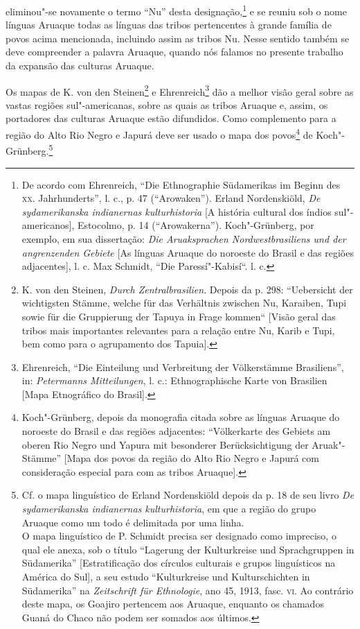eliminou"-se novamente o termo ``Nu'' desta designação,\footnote{De acordo
  com Ehrenreich, ``Die Ethnographie Südamerikas im Beginn des \textsc{xx}.
  Jahrhunderts'', l. c., p. 47 (``Arowaken''). Erland Nordenskiöld,
  \emph{De sydamerikanska indianernas kulturhistoria} {[}A história
  cultural dos índios sul"-americanos{]}, Estocolmo, p. 14
  (``Arowakerna''). Koch"-Grünberg, por exemplo, em sua dissertação:
  \emph{Die Aruaksprachen Nordwestbrasiliens und der angrenzenden
  Gebiete} {[}As línguas Aruaque do noroeste do Brasil e das regiões
  adjacentes{]}, l. c. Max Schmidt, ``Die Paressí"-Kabisí``. l. c.} e se
reuniu sob o nome línguas Aruaque todas as línguas das tribos
pertencentes à grande família de povos acima mencionada, incluindo assim
as tribos Nu. Nesse sentido também se deve compreender a palavra
Aruaque, quando nós falamos no presente trabalho da expansão das
culturas Aruaque.

Os mapas de K. von den Steinen\footnote{K. von den Steinen, \emph{Durch
  Zentralbrasilien}. Depois da p. 298: ``Uebersicht der wichtigsten
  Stämme, welche für das Verhältnis zwischen Nu, Karaiben, Tupi sowie
  für die Gruppierung der Tapuya in Frage kommen`` {[}Visão geral das
  tribos mais importantes relevantes para a relação entre Nu, Karib e
  Tupi, bem como para o agrupamento dos Tapuia{]}.} e
Ehrenreich\footnote{Ehrenreich, ``Die Einteilung und Verbreitung der
  Völkerstämme Brasiliens'', in: \emph{Petermanns Mitteilungen}, l. c.:
  Ethnographische Karte von Brasilien {[}Mapa Etnográfico do Brasil{]}.}
dão a melhor visão geral sobre as vastas regiões sul"-americanas, sobre
as quais as tribos Aruaque e, assim, os portadores das culturas Aruaque
estão difundidos. Como complemento para a região do Alto Rio Negro e
Japurá deve ser usado o mapa dos povos\footnote{Koch"-Grünberg, depois da
  monografia citada sobre as línguas Aruaque do noroeste do Brasil e das
  regiões adjacentes: ``Völkerkarte des Gebiets am oberen Rio Negro und
  Yapura mit besonderer Berücksichtigung der Aruak"-Stämme'' {[}Mapa dos
  povos da região do Alto Rio Negro e Japurá com consideração especial
  para com as tribos Aruaque{]}.} de Koch"-Grünberg.\footnote{Cf. o mapa
  linguístico de Erland Nordenskiöld depois da p. 18 de seu livro
  \emph{De sydamerikanska indianernas kulturhistoria}, em que a região
  do grupo Aruaque como um todo é delimitada por uma linha.\\
  O mapa linguístico de P. Schmidt precisa ser designado como impreciso,
  o qual ele anexa, sob o título ``Lagerung der Kulturkreise und
  Sprachgruppen in Südamerika'' {[}Estratificação dos círculos
  culturais e grupos linguísticos na América do Sul{]}, a seu estudo
  ``Kulturkreise und Kulturschichten in Südamerika'' na
  \emph{Zeitschrift für Ethnologie}, ano 45, 1913, fasc. \textsc{vi}. Ao
  contrário deste mapa, os Goajiro pertencem aos Aruaque, enquanto os
  chamados Guaná do Chaco não podem ser somados aos últimos.}

